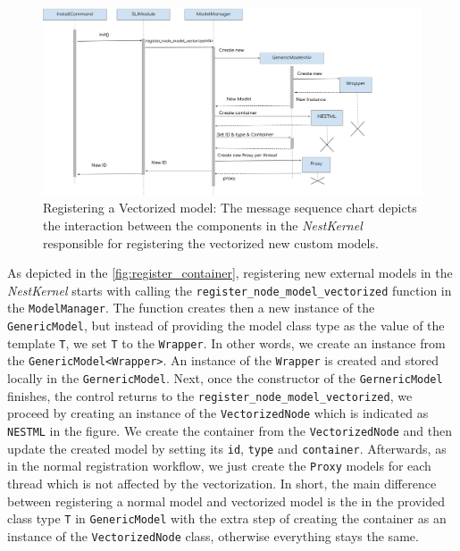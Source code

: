 \begin{figure}[h!]
\centering
\includegraphics[width=\textwidth]{src/pic/node_creation_vec.png}
\caption{Registering a Vectorized model: The message sequence chart depicts the interaction between the components in the \emph{NestKernel} responsible for registering the vectorized new custom models.}
\label{fig:register_container}
\end{figure}

As depicted in the \autoref{fig:register_container}, registering new external models in the \emph{NestKernel} starts with calling the \texttt{register\_node\_model\_vectorized} function in the \texttt{ModelManager}. The function creates then a new instance of the \texttt{GenericModel}, but instead of providing the model class type as the value of the template \texttt{T}, we set \texttt{T} to the \texttt{Wrapper}. In other words, we create an instance from the \texttt{GenericModel<Wrapper>}. An instance of the \texttt{Wrapper} is created and stored locally in the \texttt{GernericModel}. Next, once the constructor of the \texttt{GernericModel} finishes, the control returns to the \texttt{register\_node\_model\_vectorized}, we proceed by creating an instance of the \texttt{VectorizedNode} which is indicated as \texttt{NESTML} in the figure. We create the container from the \texttt{VectorizedNode} and then update the created model by setting its \texttt{id}, \texttt{type} and \texttt{container}. Afterwards, as in the normal registration workflow, we just create the \texttt{Proxy} models for each thread which is not affected by the vectorization. In short, the main difference between registering a normal model and vectorized model is the in the provided class type \texttt{T} in \texttt{GenericModel} with the extra step of creating the container as an instance of the \texttt{VectorizedNode} class, otherwise everything stays the same.


